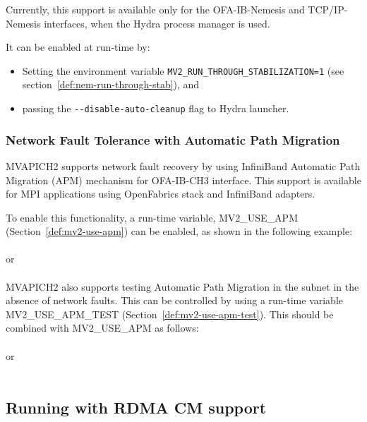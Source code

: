 Currently, this support is available only for the OFA-IB-Nemesis and
TCP/IP-Nemesis interfaces, when the Hydra process manager is used.

It can be enabled at run-time by:
\begin{itemize}
    \item Setting the environment variable
    \texttt{MV2\_RUN\_THROUGH\_STABILIZATION=1} (see
    section~\ref{def:nem-run-through-stab}), and
    \item passing the \verb|--disable-auto-cleanup| flag to Hydra launcher.
    \end{itemize}

\subsubsection{Network Fault Tolerance with Automatic Path Migration}
\label{def:mv2-apm}

MVAPICH2 supports network fault recovery by using InfiniBand Automatic
Path Migration (APM) mechanism for OFA-IB-CH3 interface. This support is
available for MPI applications using OpenFabrics stack and InfiniBand
adapters.

To enable this functionality, a run-time variable,
MV2\_USE\_APM (Section~\ref{def:mv2-use-apm})
can be enabled, as shown in the following example:
\\
 \\
or \\
 \\

MVAPICH2 also supports testing Automatic Path Migration in the subnet in the
absence of network faults. This can be controlled by using a run-time variable
MV2\_USE\_APM\_TEST (Section~\ref{def:mv2-use-apm-test}). This should be
combined with MV2\_USE\_APM as follows:
\\
\\
or \\
 \\


\subsection{Running with RDMA CM support}
\label{subsec:mpi-rdma-cm}

